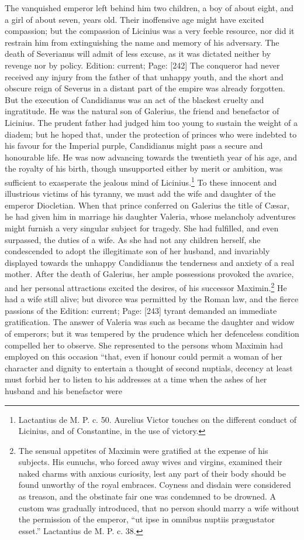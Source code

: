 The vanquished emperor left behind him two children, a boy of about eight, and a girl of about seven, years old. Their inoffensive age might have excited compassion; but the compassion of Licinius was a very feeble resource, nor did it restrain him from extinguishing the name and memory of his adversary. The death of Severianus will admit of less excuse, as it was dictated neither by revenge nor by policy. Edition: current; Page: [242] The conqueror had never received any injury from the father of that unhappy youth, and the short and obscure reign of Severus in a distant part of the empire was already forgotten. But the execution of Candidianus was an act of the blackest cruelty and ingratitude. He was the natural son of Galerius, the friend and benefactor of Licinius. The prudent father had judged him too young to sustain the weight of a diadem; but he hoped that, under the protection of princes who were indebted to his favour for the Imperial purple, Candidianus might pass a secure and honourable life. He was now advancing towards the twentieth year of his age, and the royalty of his birth, though unsupported either by merit or ambition, was sufficient to exasperate the jealous mind of Licinius.\footnote{Lactantius de M. P. c. 50. Aurelius Victor touches on the different conduct of Licinius, and of Constantine, in the use of victory.} To these innocent and illustrious victims of his tyranny, we must add the wife and daughter of the emperor Diocletian. When that prince conferred on Galerius the title of Cæsar, he had given him in marriage his daughter Valeria, whose melancholy adventures might furnish a very singular subject for tragedy. She had fulfilled, and even surpassed, the duties of a wife. As she had not any children herself, she condescended to adopt the illegitimate son of her husband, and invariably displayed towards the unhappy Candidianus the tenderness and anxiety of a real mother. After the death of Galerius, her ample possessions provoked the avarice, and her personal attractions excited the desires, of his successor Maximin.\footnote{The sensual appetites of Maximin were gratified at the expense of his subjects. His eunuchs, who forced away wives and virgins, examined their naked charms with anxious curiosity, lest any part of their body should be found unworthy of the royal embraces. Coyness and disdain were considered as treason, and the obstinate fair one was condemned to be drowned. A custom was gradually introduced, that no person should marry a wife without the permission of the emperor, \texthebrew{“}ut ipse in omnibus nuptiis prægustator esset.\texthebrew{}” Lactantius de M. P. c. 38.} He had a wife still alive; but divorce was permitted by the Roman law, and the fierce passions of the Edition: current; Page: [243] tyrant demanded an immediate gratification. The answer of Valeria was such as became the daughter and widow of emperors; but it was tempered by the prudence which her defenceless condition compelled her to observe. She represented to the persons whom Maximin had employed on this occasion \texthebrew{“}that, even if honour could permit a woman of her character and dignity to entertain a thought of second nuptials, decency at least must forbid her to listen to his addresses at a time when the ashes of her husband and his benefactor were 